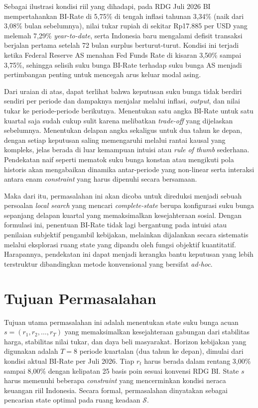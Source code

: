 Sebagai ilustrasi kondisi riil yang dihadapi, pada RDG Juli 2026 BI mempertahankan BI-Rate di 5,75\% di tengah inflasi tahunan 3,34\% (naik dari 3,08\% bulan sebelumnya), nilai tukar rupiah di sekitar Rp17.885 per USD yang melemah 7,29\% \textit{year-to-date}, serta Indonesia baru mengalami defisit transaksi berjalan pertama setelah 72 bulan surplus berturut-turut. Kondisi ini terjadi ketika Federal Reserve AS menahan Fed Funds Rate di kisaran 3,50\% sampai 3,75\%, sehingga selisih suku bunga BI-Rate terhadap suku bunga AS menjadi pertimbangan penting untuk mencegah arus keluar modal asing.

Dari uraian di atas, dapat terlihat bahwa keputusan suku bunga tidak berdiri sendiri per periode dan dampaknya menjalar melalui inflasi, \textit{output}, dan nilai tukar ke periode-periode berikutnya. Menentukan satu angka BI-Rate untuk satu kuartal saja sudah cukup sulit karena melibatkan \textit{trade-off} yang dijelaskan sebelumnya. Menentukan delapan angka sekaligus untuk dua tahun ke depan, dengan setiap keputusan saling memengaruhi melalui rantai kausal yang kompleks, jelas berada di luar kemampuan intuisi atau \textit{rule of thumb} sederhana. Pendekatan naif seperti mematok suku bunga konstan atau mengikuti pola historis akan mengabaikan dinamika antar-periode yang non-linear serta interaksi antara enam \textit{constraint} yang harus dipenuhi secara bersamaan.

Maka dari itu, permasalahan ini akan dicoba untuk direduksi menjadi sebuah persoalan \textit{local search} yang mencari \textit{complete-state} berupa konfigurasi suku bunga sepanjang delapan kuartal yang memaksimalkan kesejahteraan sosial. Dengan formulasi ini, penentuan BI-Rate tidak lagi bergantung pada intuisi atau penilaian subjektif pengambil kebijakan, melainkan dijalankan secara sistematis melalui eksplorasi ruang state yang dipandu oleh fungsi objektif kuantitatif. Harapannya, pendekatan ini dapat menjadi kerangka bantu keputusan yang lebih terstruktur dibandingkan metode konvensional yang bersifat \textit{ad-hoc}.

\section{Tujuan Permasalahan}

Tujuan utama permasalahan ini adalah menentukan state suku bunga acuan $s = (r_1, r_2, \dots, r_T)$ yang memaksimalkan kesejahteraan gabungan dari stabilitas harga, stabilitas nilai tukar, dan daya beli masyarakat. Horizon kebijakan yang digunakan adalah $T = 8$ periode kuartalan (dua tahun ke depan), dimulai dari kondisi aktual BI-Rate per Juli 2026. Tiap $r_t$ harus berada dalam rentang 3,00\% sampai 8,00\% dengan kelipatan 25 basis poin sesuai konvensi RDG BI. State $s$ harus memenuhi beberapa \textit{constraint} yang mencerminkan kondisi neraca keuangan riil Indonesia. Secara formal, permasalahan dinyatakan sebagai pencarian state optimal pada ruang keadaan $\mathcal{S}$.

